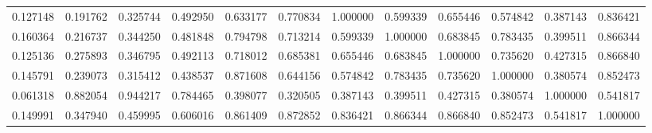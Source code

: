 \begin{table}
\begin{tabular}{lcr}
0.127148 & 0.191762 & 0.325744 & 0.492950 & 0.633177 & 0.770834 & 1.000000 & 0.599339 & 0.655446 & 0.574842 & 0.387143 & 0.836421 \\
0.160364 & 0.216737 & 0.344250 & 0.481848 & 0.794798 & 0.713214 & 0.599339 & 1.000000 & 0.683845 & 0.783435 & 0.399511 & 0.866344 \\
0.125136 & 0.275893 & 0.346795 & 0.492113 & 0.718012 & 0.685381 & 0.655446 & 0.683845 & 1.000000 & 0.735620 & 0.427315 & 0.866840 \\
0.145791 & 0.239073 & 0.315412 & 0.438537 & 0.871608 & 0.644156 & 0.574842 & 0.783435 & 0.735620 & 1.000000 & 0.380574 & 0.852473 \\
0.061318 & 0.882054 & 0.944217 & 0.784465 & 0.398077 & 0.320505 & 0.387143 & 0.399511 & 0.427315 & 0.380574 & 1.000000 & 0.541817 \\
0.149991 & 0.347940 & 0.459995 & 0.606016 & 0.861409 & 0.872852 & 0.836421 & 0.866344 & 0.866840 & 0.852473 & 0.541817 & 1.000000 \\
\bottomrule
\end{tabular}
\end{table}
